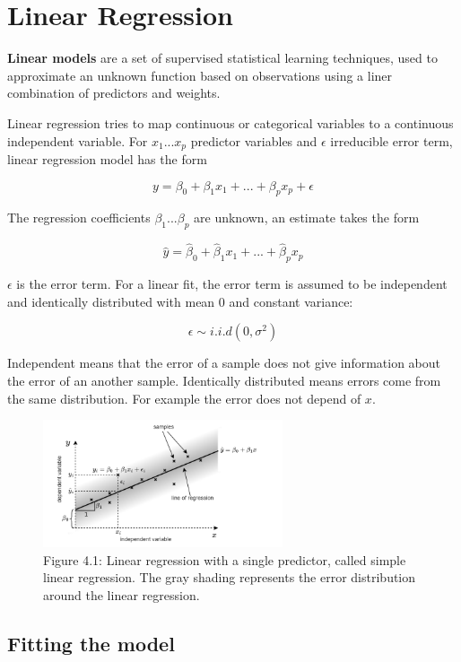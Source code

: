 \chapter{Linear Regression}

\textbf{Linear models} are a set of supervised statistical learning techniques, used to approximate an unknown function based on observations using a liner combination of predictors and weights.

Linear regression tries to map continuous or categorical variables to a continuous independent variable. For \(x_1...x_p\) predictor variables and \(\epsilon\) irreducible error term, linear regression model has the form

\[y = \beta _0 + \beta _1 x_1 + ... + \beta _p x_p + \epsilon\]

The regression coefficients \(\beta_1...\beta_p\) are unknown, an estimate takes the form

\[\hat y = \hat \beta _0 + \hat \beta _1 x_1 + ... +  \hat \beta _p x_p\]

\(\epsilon\) is the error term. For a linear fit, the error term is assumed to be independent and identically distributed with mean 0 and constant variance:

\[\epsilon \sim i.i.d(0, \sigma^2)\]

Independent means that the error of a sample does not give information about the error of an another sample. Identically distributed means errors come from the same distribution. For example the error does not depend of \(x\).


\begin{figure}[htbp]
    \begin{center}
        \includegraphics[width=200pt]{../img/04-linear-regression.png}
        \caption{Figure 4.1: Linear regression with a single predictor, called simple linear regression. The gray shading represents the error distribution around the linear regression.}
    \end{center}
\end{figure}


\section{Fitting the model}

